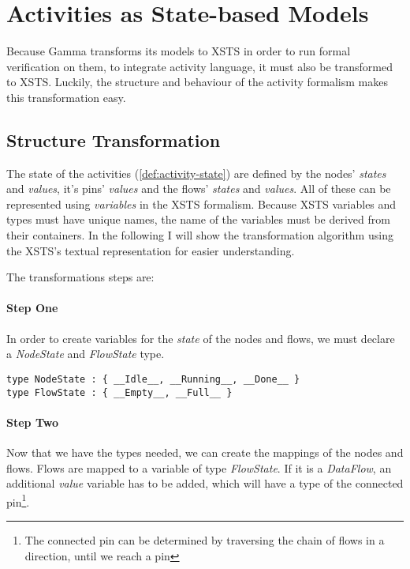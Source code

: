 \section{Activities as State-based Models}\label{sec:activities-as-state-based-models}

Because Gamma transforms its models to XSTS in order to run formal verification on them, to integrate activity language, it must also be transformed to XSTS. Luckily, the structure and behaviour of the activity formalism makes this transformation easy.

\subsection{Structure Transformation}

The state of the activities (\autoref{def:activity-state}) are defined by the nodes' \emph{states} and \emph{values}, it's pins' \emph{values} and the flows' \emph{states} and \emph{values}. All of these can be represented using \emph{variables} in the XSTS formalism. Because XSTS variables and types must have unique names, the name of the variables must be derived from their containers. In the following I will show the transformation algorithm using the XSTS's textual representation for easier understanding.

The transformations steps are:

\paragraph{Step One} 

In order to create variables for the \emph{state} of the nodes and flows, we must declare a \emph{NodeState} and \emph{FlowState} type.

\begin{lstlisting}[language=xsts]
type NodeState : { __Idle__, __Running__, __Done__ }
type FlowState : { __Empty__, __Full__ }
\end{lstlisting}

\paragraph{Step Two} 

Now that we have the types needed, we can create the mappings of the nodes and flows. Flows are mapped to a variable of type \emph{FlowState}. If it is a \emph{DataFlow}, an additional \emph{value} variable has to be added, which will have a type of the connected pin\footnote{The connected pin can be determined by traversing the chain of flows in a direction, until we reach a pin}.

